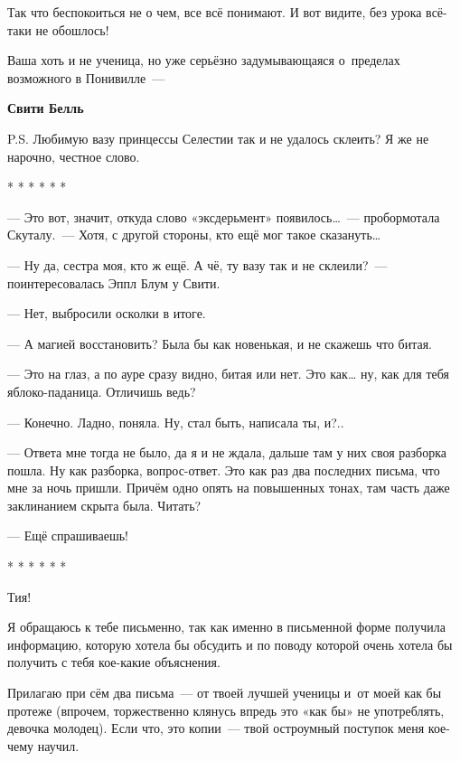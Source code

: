 \documentclass[fontsize=11pt,a5paper,titlepage=firstcover]{scrbook}
\begin{document}
Так что беспокоиться не о чем, все всё понимают. И вот видите, без урока всё-таки не обошлось!

Ваша хоть и не ученица, но уже серьёзно задумывающаяся о~пределах возможного в Понивилле~---
\begin{flushright}\textbf{Свити Белль}\end{flushright}
P.S. Любимую вазу принцессы Селестии так и не удалось склеить? Я же не нарочно, честное слово.

\vspace{2mm}
\begin{center}
	* * * * * *
\end{center}
\vspace{2mm}

--- Это вот, значит, откуда слово «эксдерьмент» появилось{\ldots}~--- пробормотала Скуталу.~--- Хотя, с другой стороны, кто ещё мог такое сказануть{\ldots}

--- Ну да, сестра моя, кто ж ещё. А чё, ту вазу так и не склеили?~--- поинтересовалась Эппл Блум у Свити.

--- Нет, выбросили осколки в итоге.

--- А магией восстановить? Была бы как новенькая, и не скажешь что битая.

--- Это на глаз, а по ауре сразу видно, битая или нет. Это как{\ldots} ну, как для тебя яблоко-паданица. Отличишь ведь?

--- Конечно. Ладно, поняла. Ну, стал быть, написала ты, и?..

--- Ответа мне тогда не было, да я и не ждала, дальше там у них своя разборка пошла. Ну как разборка, вопрос-ответ. Это как раз два последних письма, что мне за ночь пришли. Причём одно опять на повышенных тонах, там часть даже заклинанием скрыта была. Читать?

--- Ещё спрашиваешь!
\begin{center}
	* * * * * *
\end{center}

Тия!

Я обращаюсь к тебе письменно, так как именно в письменной форме получила информацию, которую хотела бы обсудить и по поводу которой очень хотела бы получить с тебя кое-какие объяснения.

Прилагаю при сём два письма~--- от твоей лучшей ученицы и~от моей как бы протеже (впрочем, торжественно клянусь впредь это «как бы» не употреблять, девочка молодец). Если что, это копии~--- твой остроумный поступок меня кое-чему научил.
\end{document}
